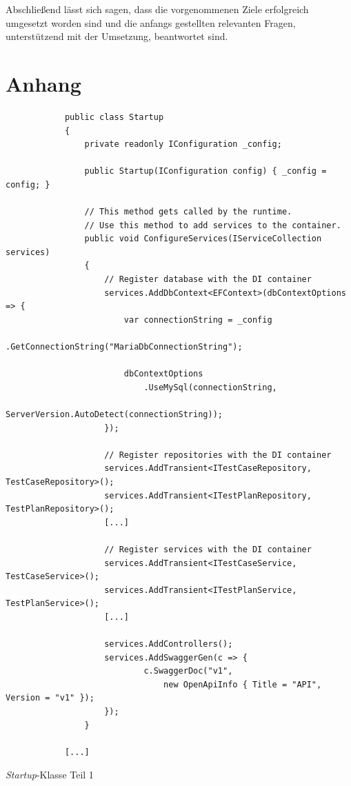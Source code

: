 \documentclass[a4paper, fontsize=11pt, parskip=half, twoside]{scrreprt}
\begin{document}
	Abschließend lässt sich sagen, dass die vorgenommenen Ziele erfolgreich umgesetzt worden sind und die anfangs gestellten relevanten Fragen, unterstützend mit der Umsetzung, beantwortet sind.
	
	
	\clearpage
	\printbibliography
	
	\chapter*{Anhang}
	\begin{listing}[ht]
		\begin{verbatim}
			public class Startup
			{
				private readonly IConfiguration _config;		
				
				public Startup(IConfiguration config) { _config = config; }
				
				// This method gets called by the runtime. 
				// Use this method to add services to the container.
				public void ConfigureServices(IServiceCollection services)
				{
					// Register database with the DI container
					services.AddDbContext<EFContext>(dbContextOptions => {
						var connectionString = _config
							.GetConnectionString("MariaDbConnectionString");	
									
						dbContextOptions
							.UseMySql(connectionString,
								ServerVersion.AutoDetect(connectionString));
					});
					
					// Register repositories with the DI container
					services.AddTransient<ITestCaseRepository, TestCaseRepository>();
					services.AddTransient<ITestPlanRepository, TestPlanRepository>();
					[...]
					
					// Register services with the DI container
					services.AddTransient<ITestCaseService, TestCaseService>();
					services.AddTransient<ITestPlanService, TestPlanService>();
					[...]
					
					services.AddControllers();
					services.AddSwaggerGen(c => { 
							c.SwaggerDoc("v1", 
								new OpenApiInfo { Title = "API", Version = "v1" }); 
					});
				}
				
			[...]
		\end{verbatim}
		\caption{\emph{Startup}-Klasse Teil 1}
		\label{lst:startupClassPart1}
	\end{listing}
\end{document}
